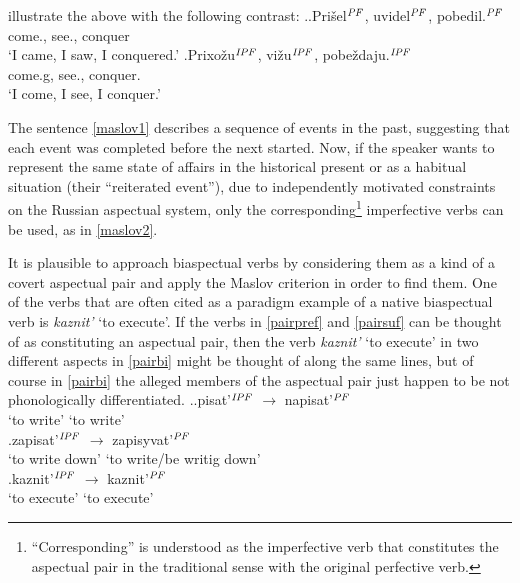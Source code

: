 \citet{Mikaelian:07} illustrate the above with the following contrast: 
\ex.\label{maslov}\ag.\label{maslov1}Pri\v{s}el$^{{\mathit{PF}}}$, uvidel$^{{\mathit{PF}}}$, pobedil.$^{{\mathit{PF}}}$\\
come., see., conquer\\
\vspace{0.5em}
`I came, I saw, I conquered.'
\bg.\label{maslov2}Prixo\v{z}u$^{{\mathit{IPF}}}$, vi\v{z}u$^{{\mathit{IPF}}}$, pobe\v{z}daju.$^{{\mathit{IPF}}}$\\
come.g, see., conquer.\\
\vspace{0.5em}
`I come, I see, I conquer.'

The sentence \ref{maslov1} describes a sequence of events in the past, suggesting that each event was completed before the next started. Now, if the speaker wants to represent the same state of affairs in the historical present or as a habitual situation (their ``reiterated event''), due to independently motivated constraints on the Russian aspectual system, only the corresponding\footnote{``Corresponding'' is understood as the imperfective verb that constitutes the aspectual pair in the traditional sense with the original perfective verb.} imperfective verbs can be used, as in \ref{maslov2}.

It is plausible to approach biaspectual verbs by considering them as a kind of a covert aspectual pair and apply the Maslov criterion in order to find them. One of the verbs that are often cited as a paradigm example of a native biaspectual verb is \emph{kaznit'} `to execute'. If the verbs in \ref{pairpref} and \ref{pairsuf} can be thought of as constituting an aspectual pair, then the verb \textit{kaznit'} `to execute' in two different aspects in \ref{pairbi} might be thought of along the same lines, but of course in \ref{pairbi} the alleged members of the aspectual pair just happen to be not phonologically differentiated.
\ex.\ag.\label{pairpref}{pisat'$^{{\mathit{IPF}}}$} {$\rightarrow$} {napisat'$^{{\mathit{PF}}}$}\\
{`to write'} {} {`to write'}\\
\bg.\label{pairsuf}{zapisat'$^{{\mathit{IPF}}}$} {$\rightarrow$} {zapisyvat'$^{{\mathit{PF}}}$}\\
{`to write down'} {} {`to write/be writig down'}\\
\bg.\label{pairbi}{kaznit'$^{{\mathit{IPF}}}$} {$\rightarrow$} {kaznit'$^{{\mathit{PF}}}$}\\
{`to execute'} {} {`to execute'}\\

